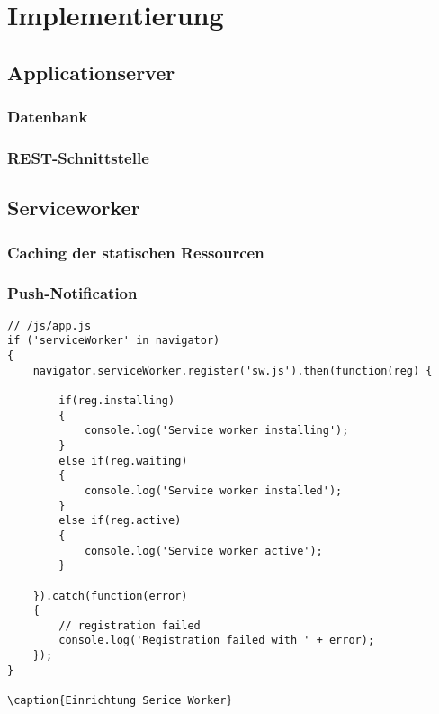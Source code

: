 \chapter{Implementierung}

\section{Applicationserver}

\subsection{Datenbank}
\label{subsec_implementierung_datenbank}

\subsection{REST-Schnittstelle}

\section{Serviceworker}

\subsection{Caching der statischen Ressourcen}

\subsection{Push-Notification}


\begin{lstlisting}
// /js/app.js
if ('serviceWorker' in navigator)
{
    navigator.serviceWorker.register('sw.js').then(function(reg) {

        if(reg.installing)
        {
            console.log('Service worker installing');
        } 
        else if(reg.waiting)
        {
            console.log('Service worker installed');
        } 
        else if(reg.active)
        {
            console.log('Service worker active');
        }

    }).catch(function(error)
    {
        // registration failed
        console.log('Registration failed with ' + error);
    });
}

\caption{Einrichtung Serice Worker}
\end{lstlisting}
